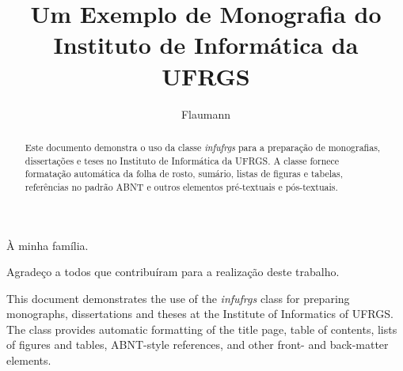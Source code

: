 \documentclass[ppgc,diss,english]{infufrgs}
\title{Um Exemplo de Monografia do Instituto de Informática da UFRGS}
\author{Flaumann}{Fritz Gutenberg}
\begin{document}

\maketitle

\begin{dedicatoria}
  À minha família.
\end{dedicatoria}

\begin{agradecimentos}
  Agradeço a todos que contribuíram para a realização deste trabalho.
\end{agradecimentos}

\begin{abstract}
  Este documento demonstra o uso da classe \textit{infufrgs} para a preparação
  de monografias, dissertações e teses no Instituto de Informática da UFRGS.
  A classe fornece formatação automática da folha de rosto, sumário, listas de
  figuras e tabelas, referências no padrão ABNT e outros elementos
  pré-textuais e pós-textuais.
\end{abstract}

\begin{translatedabstract}
  This document demonstrates the use of the \textit{infufrgs} class for
  preparing monographs, dissertations and theses at the Institute of
  Informatics of UFRGS.  The class provides automatic formatting of the
  title page, table of contents, lists of figures and tables, ABNT-style
  references, and other front- and back-matter elements.
\end{translatedabstract}

\tableofcontents
\end{document}

